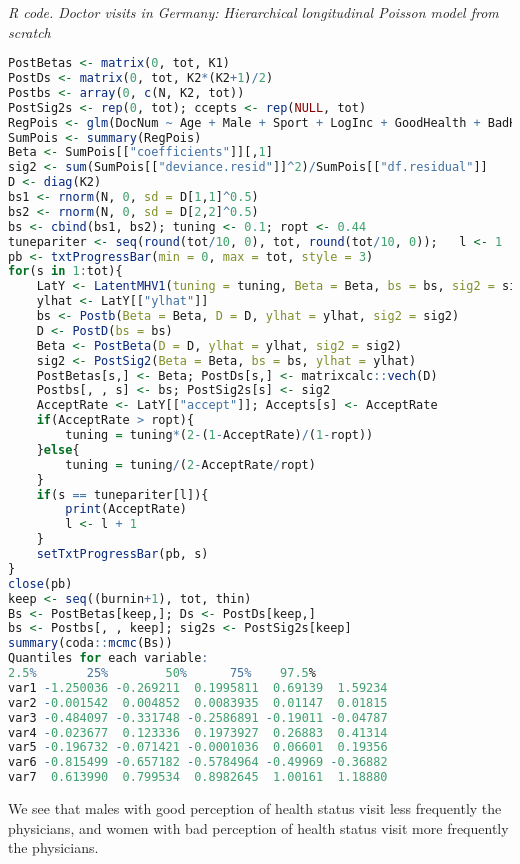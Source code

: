 \begin{enumerate}[leftmargin=*]
\begin{tcolorbox}[enhanced,width=4.67in,center upper,
	fontupper=\large\bfseries,drop shadow southwest,sharp corners]
	\textit{R code. Doctor visits in Germany: Hierarchical longitudinal Poisson model from scratch}
	\begin{VF}
		\begin{lstlisting}[language=R]
PostBetas <- matrix(0, tot, K1)
PostDs <- matrix(0, tot, K2*(K2+1)/2)
Postbs <- array(0, c(N, K2, tot))
PostSig2s <- rep(0, tot); ccepts <- rep(NULL, tot)
RegPois <- glm(DocNum ~ Age + Male + Sport + LogInc + GoodHealth + BadHealth, family = poisson(link = "log"))
SumPois <- summary(RegPois)
Beta <- SumPois[["coefficients"]][,1]
sig2 <- sum(SumPois[["deviance.resid"]]^2)/SumPois[["df.residual"]]
D <- diag(K2)
bs1 <- rnorm(N, 0, sd = D[1,1]^0.5)
bs2 <- rnorm(N, 0, sd = D[2,2]^0.5)
bs <- cbind(bs1, bs2); tuning <- 0.1; ropt <- 0.44
tunepariter <- seq(round(tot/10, 0), tot, round(tot/10, 0));   l <- 1
pb <- txtProgressBar(min = 0, max = tot, style = 3)
for(s in 1:tot){
	LatY <- LatentMHV1(tuning = tuning, Beta = Beta, bs = bs, sig2 = sig2)
	ylhat <- LatY[["ylhat"]]
	bs <- Postb(Beta = Beta, D = D, ylhat = ylhat, sig2 = sig2)
	D <- PostD(bs = bs)
	Beta <- PostBeta(D = D, ylhat = ylhat, sig2 = sig2)
	sig2 <- PostSig2(Beta = Beta, bs = bs, ylhat = ylhat)
	PostBetas[s,] <- Beta; PostDs[s,] <- matrixcalc::vech(D)
	Postbs[, , s] <- bs; PostSig2s[s] <- sig2
	AcceptRate <- LatY[["accept"]]; Accepts[s] <- AcceptRate
	if(AcceptRate > ropt){
		tuning = tuning*(2-(1-AcceptRate)/(1-ropt))
	}else{
		tuning = tuning/(2-AcceptRate/ropt)
	}
	if(s == tunepariter[l]){
		print(AcceptRate)
		l <- l + 1
	}
	setTxtProgressBar(pb, s)
}
close(pb)
keep <- seq((burnin+1), tot, thin)
Bs <- PostBetas[keep,]; Ds <- PostDs[keep,]
bs <- Postbs[, , keep]; sig2s <- PostSig2s[keep]
summary(coda::mcmc(Bs))
Quantiles for each variable:
2.5%       25%        50%      75%    97.5%
var1 -1.250036 -0.269211  0.1995811  0.69139  1.59234
var2 -0.001542  0.004852  0.0083935  0.01147  0.01815
var3 -0.484097 -0.331748 -0.2586891 -0.19011 -0.04787
var4 -0.023677  0.123336  0.1973927  0.26883  0.41314
var5 -0.196732 -0.071421 -0.0001036  0.06601  0.19356
var6 -0.815499 -0.657182 -0.5784964 -0.49969 -0.36882
var7  0.613990  0.799534  0.8982645  1.00161  1.18880
\end{lstlisting}
	\end{VF}
\end{tcolorbox} 

We see that males with good perception of health status visit less frequently the physicians, and women with bad perception of health status visit more frequently the physicians.

\end{enumerate}
